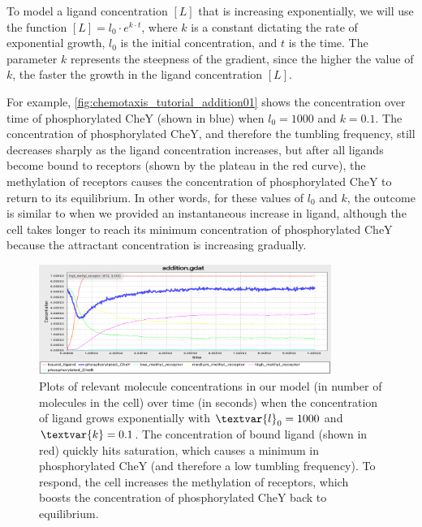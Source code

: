 To model a ligand concentration $[L]$ that is increasing exponentially, we will use the function $[L] = l_0 \cdot e^{k \cdot t}$, where $k$ is a constant dictating the rate of exponential growth, $l_0$ is the initial concentration, and $t$ is the time. The parameter $k$ represents the steepness of the gradient, since the higher the value of $k$, the faster the growth in the ligand concentration $[L]$.

For example, \autoref{fig:chemotaxis_tutorial_addition01} shows the concentration over time of phosphorylated CheY (shown in blue) when $l_0 = 1000$ and $k = 0.1$. The concentration of phosphorylated CheY, and therefore the tumbling frequency, still decreases sharply as the ligand concentration increases, but after all ligands become bound to receptors (shown by the plateau in the red curve), the methylation of receptors causes the concentration of phosphorylated CheY to return to its equilibrium. In other words, for these values of $l_0$ and $k$, the outcome is similar to when we provided an instantaneous increase in ligand, although the cell takes longer to reach its minimum concentration of phosphorylated CheY because the attractant concentration is increasing gradually.\\

\begin{figure}[h]
\centering
\mySfFamily
\includegraphics[width = 0.85\textwidth]{../images/chemotaxis_tutorial_addition01.png}
\caption{Plots of relevant molecule concentrations in our model (in number of molecules in the cell) over time (in seconds) when the concentration of ligand grows exponentially with $\textvar{l}_\text{0} = \text{1000}$ and $\textvar{k} = \text{0.1}$. The concentration of bound ligand (shown in red) quickly hits saturation, which causes a minimum in phosphorylated CheY (and therefore a low tumbling frequency). To respond, the cell increases the methylation of receptors, which boosts the concentration of phosphorylated CheY back to equilibrium.}
\label{fig:chemotaxis_tutorial_addition01}
\end{figure}


